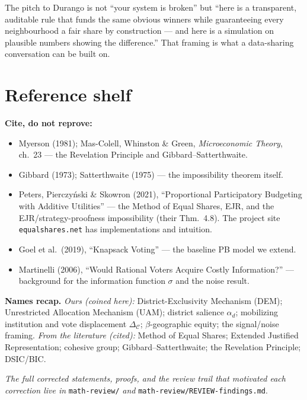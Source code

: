 \documentclass[11pt,letterpaper]{article}
\theoremstyle{definition}
\theoremstyle{plain}
\theoremstyle{remark}
\newcommand{\salience}{\alpha}
\begin{document}
\begin{connection}
The pitch to Durango is not ``your system is broken'' but ``here is a transparent, auditable rule
that funds the same obvious winners while guaranteeing every neighbourhood a fair share by
construction --- and here is a simulation on plausible numbers showing the difference.'' That framing
is what a data-sharing conversation can be built on.
\end{connection}

\section*{Reference shelf}

\noindent\textbf{Cite, do not reprove:}
\begin{itemize}[nosep]
  \item Myerson (1981); Mas-Colell, Whinston \& Green, \emph{Microeconomic Theory}, ch.~23 --- the
        Revelation Principle and Gibbard--Satterthwaite.
  \item Gibbard (1973); Satterthwaite (1975) --- the impossibility theorem itself.
  \item Peters, Pierczy\'nski \& Skowron (2021), ``Proportional Participatory Budgeting with
        Additive Utilities'' --- the Method of Equal Shares, EJR, and the EJR/strategy-proofness
        impossibility (their Thm.~4.8). The project site \texttt{equalshares.net} has
        implementations and intuition.
  \item Goel et al.\ (2019), ``Knapsack Voting'' --- the baseline PB model we extend.
  \item Martinelli (2006), ``Would Rational Voters Acquire Costly Information?'' --- background for the
        information function $\sigma$ and the noise result.
\end{itemize}

\bigskip
\noindent\textbf{Names recap.} \emph{Ours (coined here):} District-Exclusivity Mechanism (DEM);
Unrestricted Allocation Mechanism (UAM); district salience $\salience_d$; mobilizing institution and
vote displacement $\Delta_\mathcal{C}$; $\beta$-geographic equity; the signal/noise framing.
\emph{From the literature (cited):} Method of Equal Shares; Extended Justified Representation;
cohesive group; Gibbard--Satterthwaite; the Revelation Principle; DSIC/BIC.

\bigskip
\noindent\emph{The full corrected statements, proofs, and the review trail that motivated each
correction live in} \texttt{math-review/} \emph{and} \texttt{math-review/REVIEW-findings.md}.
\end{document}
